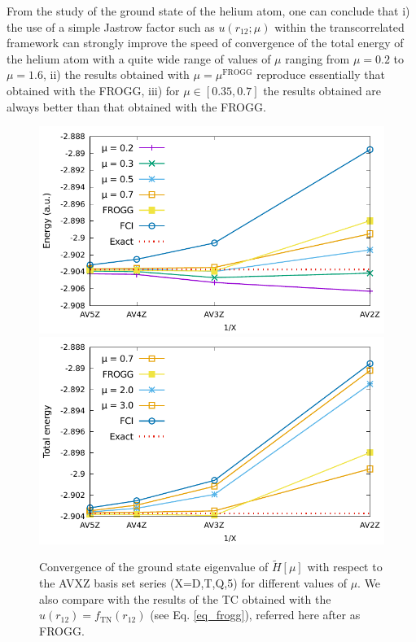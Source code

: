 \documentclass[aip,jcp,reprint,noshowkeys,superscriptaddress]{revtex4-1}
\newcommand{\mfrogg}[0]{\mu^\text{FROGG}}
\begin{document}
From the study of the ground state of the helium atom, one can conclude that i) the use of a simple Jastrow factor such as $u(r_{12};\mu)$ within the transcorrelated framework can strongly improve the speed of convergence of the total energy of the helium atom with a quite wide range of values of $\mu$ ranging from $\mu=0.2$ to $\mu=1.6$, 
ii) the results obtained with $\mu=\mfrogg$ reproduce essentially that obtained with the FROGG, 
iii) for $\mu \in[ 0.35,0.7]$ the results obtained are always better than that obtained with the FROGG. 
\begin{figure}
 \label{fig_conv_e_mu}
        \includegraphics[width=0.45\linewidth]{plots/He/Energy/He_E_conv_basis_small_mu.pdf}
        \includegraphics[width=0.45\linewidth]{plots/He/Energy/He_E_conv_basis_large_mu.pdf}\\
        \caption{Convergence of the ground state eigenvalue of $\tilde{H}[\mu]$ with respect to the AVXZ basis set series (X=D,T,Q,5) for different values of $\mu$. 
We also compare with the results of the TC obtained with the $u(r_{12}) = f_{\text{TN}}(r_{12})$ (see Eq. \eqref{eq_frogg}), referred here after as FROGG. }
\end{figure}
\end{document}
